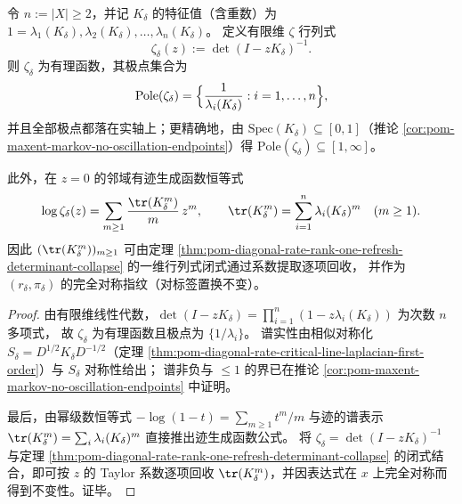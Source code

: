\begin{corollary}\label{cor:pom-diagonal-rate-rank-one-refresh-trace-zeta-fingerprint}
令 \(n:=|X|\ge 2\)，并记 \(K_\delta\) 的特征值（含重数）为
\(
1=\lambda_1(K_\delta),\lambda_2(K_\delta),\dots,\lambda_n(K_\delta)
\)。
定义有限维 \(\zeta\) 行列式
\[
\zeta_\delta(z):=\det(I-zK_\delta)^{-1}.
\]
则 \(\zeta_\delta\) 为有理函数，其极点集合为
\[
\mathrm{Pole}(\zeta_\delta)=\Bigl\{\frac{1}{\lambda_i(K_\delta)}:i=1,\dots,n\Bigr\},
\]
并且全部极点都落在实轴上；更精确地，由 \(\mathrm{Spec}(K_\delta)\subseteq[0,1]\)（推论 \ref{cor:pom-maxent-markov-no-oscillation-endpoints}）得
\(
\mathrm{Pole}(\zeta_\delta)\subseteq [1,\infty]
\)。
\par
此外，在 \(z=0\) 的邻域有迹生成函数恒等式
\[
\log \zeta_\delta(z)=\sum_{m\ge 1}\frac{\tr(K_\delta^m)}{m}\,z^m,
\qquad
\tr(K_\delta^m)=\sum_{i=1}^{n}\lambda_i(K_\delta)^m\quad(m\ge 1).
\]
因此 \((\tr(K_\delta^m))_{m\ge 1}\) 可由定理 \ref{thm:pom-diagonal-rate-rank-one-refresh-determinant-collapse} 的一维行列式闭式通过系数提取逐项回收，
并作为 \((r_\delta,\pi_\delta)\) 的完全对称指纹（对标签置换不变）。
\end{corollary}
\begin{proof}
由有限维线性代数，\(\det(I-zK_\delta)=\prod_{i=1}^{n}(1-z\lambda_i(K_\delta))\) 为次数 \(n\) 多项式，
故 \(\zeta_\delta\) 为有理函数且极点为 \(\{1/\lambda_i\}\)。
谱实性由相似对称化 \(S_\delta=D^{1/2}K_\delta D^{-1/2}\)（定理 \ref{thm:pom-diagonal-rate-critical-line-laplacian-first-order}）与 \(S_\delta\) 对称性给出；
谱非负与 \(\le 1\) 的界已在推论 \ref{cor:pom-maxent-markov-no-oscillation-endpoints} 中证明。
\par
最后，由幂级数恒等式 \(-\log(1-t)=\sum_{m\ge 1}t^m/m\) 与迹的谱表示
\(
\tr(K_\delta^m)=\sum_i \lambda_i(K_\delta)^m
\)
直接推出迹生成函数公式。
将 \(\zeta_\delta=\det(I-zK_\delta)^{-1}\) 与定理 \ref{thm:pom-diagonal-rate-rank-one-refresh-determinant-collapse} 的闭式结合，即可按 \(z\) 的 Taylor 系数逐项回收 \(\tr(K_\delta^m)\)，并因表达式在 \(x\) 上完全对称而得到不变性。证毕。
\end{proof}

